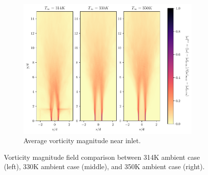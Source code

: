 \begin{figure}[H]
\vfill
\centering
\begin{subfigure}{0.5\textwidth}
	\includegraphics[scale=.45]{figures/Plots/vertical/magvort_scaled_vert_avg_all_zoom.pdf}
	\caption{Average vorticity magnitude near inlet.} \label{all_magvort_3}
\end{subfigure}
\caption{Vorticity magnitude field comparison between 314K ambient case (left), 330K ambient case (middle), and 350K ambient case (right).}
\label{all_magvort_features}
\end{figure}

